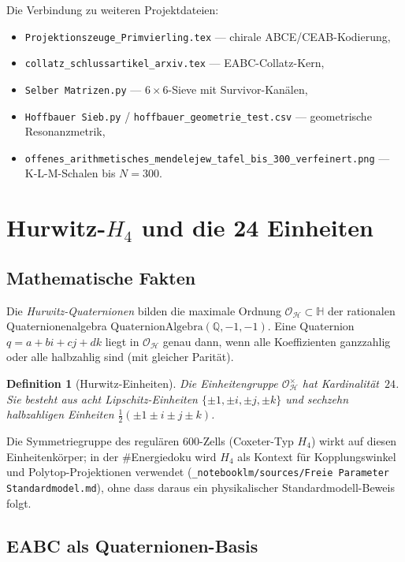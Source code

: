 \documentclass[12pt,a4paper]{article}
\newtheorem{definition}[satz]{Definition}
\newcommand{\Hur}{\mathcal{H}}
\newcommand{\OH}{\mathcal{O}_\Hur}
\begin{document}
Die Verbindung zu weiteren Projektdateien:
\begin{itemize}[nosep]
  \item \texttt{Projektionszeuge\_Primvierling.tex} --- chirale ABCE/CEAB-Kodierung,
  \item \texttt{collatz\_schlussartikel\_arxiv.tex} --- EABC-Collatz-Kern,
  \item \texttt{Selber Matrizen.py} --- $6\times 6$-Sieve mit Survivor-Kanälen,
  \item \texttt{Hoffbauer Sieb.py} / \texttt{hoffbauer\_geometrie\_test.csv} --- geometrische Resonanzmetrik,
  \item \texttt{offenes\_arithmetisches\_mendelejew\_tafel\_bis\_300\_verfeinert.png} --- K-L-M-Schalen bis $N=300$.
\end{itemize}

\section{Hurwitz-$H_4$ und die 24 Einheiten}
\label{sec:hurwitz}

\subsection{Mathematische Fakten}

Die \emph{Hurwitz-Quaternionen} bilden die maximale Ordnung
$\OH\subset\mathbb{H}$ der rationalen Quaternionenalgebra
$\mathrm{QuaternionAlgebra}(\mathbb{Q},-1,-1)$.
Eine Quaternion $q=a+bi+cj+dk$ liegt in $\OH$ genau dann, wenn
alle Koeffizienten ganzzahlig oder alle halbzahlig sind
(mit gleicher Parität).

\begin{definition}[Hurwitz-Einheiten]
Die Einheitengruppe $\OH^\times$ hat Kardinalität~$24$.
Sie besteht aus acht Lipschitz-Einheiten $\{\pm1,\pm i,\pm j,\pm k\}$
und sechzehn halbzahligen Einheiten
$\tfrac12(\pm1\pm i\pm j\pm k)$.
\end{definition}

Die Symmetriegruppe des regulären 600-Zells (Coxeter-Typ $H_4$)
wirkt auf diesen Einheitenkörper; in der \#Energiedoku wird $H_4$
als Kontext für Kopplungswinkel und Polytop-Projektionen verwendet
(\texttt{\_notebooklm/sources/Freie Parameter Standardmodel.md}),
ohne dass daraus ein physikalischer Standardmodell-Beweis folgt.

\subsection{EABC als Quaternionen-Basis}
\end{document}
